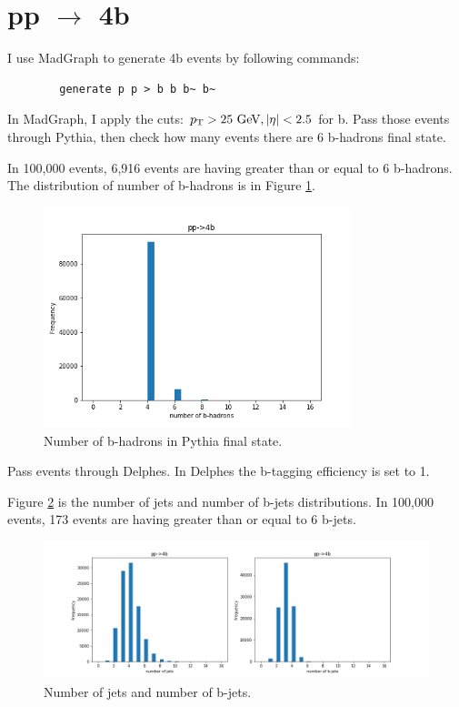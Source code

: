 \documentclass[12pt]{article}
\begin{document}
\section{\texorpdfstring{pp $\to $ 4b}{pp to 4b}}%
\label{sec:pp_4b}
	I use MadGraph to generate 4b events by following commands:
	\begin{verbatim}
		generate p p > b b b~ b~ 
	\end{verbatim}
	In MadGraph, I apply the cuts: $p_\text{T}>\text{25 GeV}, \abs{\eta}<2.5$ for b. Pass those events through Pythia, then check how many events there are 6 b-hadrons final state.

	In 100,000 events, 6,916 events are having greater than or equal to 6 b-hadrons. The distribution of number of b-hadrons is in Figure \ref{fig:number_of_b_hadron}.
	\begin{figure}[htpb]
		\centering
		\includegraphics[width=0.8\textwidth]{number_of_b-hadrons.png}
		\caption{Number of b-hadrons in Pythia final state.}
		\label{fig:number_of_b_hadron}
	\end{figure}

	Pass events through Delphes. In Delphes the b-tagging efficiency is set to 1.

	Figure \ref{fig:number_of_jet} is the number of jets and number of b-jets distributions. In 100,000 events, 173 events are having greater than or equal to 6 b-jets.
	\begin{figure}[htpb]
		\centering
		\includegraphics[width=1\textwidth]{number_of_b-jets.png}
		\caption{Number of jets and number of b-jets.}
		\label{fig:number_of_jet}
	\end{figure}
\end{document}
